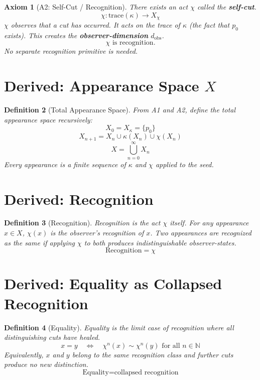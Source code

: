 \documentclass[12pt]{article}
\newtheorem{axiom}{Axiom}
\newtheorem{definition}[axiom]{Definition}
\begin{document}
\begin{axiom}[A2: Self-Cut / Recognition]
There exists an act \(\chi\) called the \textbf{self-cut}.
\[
\chi: \text{trace}(\kappa) \longrightarrow X_\chi
\]
\(\chi\) observes that a cut has occurred. It acts on the trace of \(\kappa\) (the fact that \(p_0\) exists).
This creates the \textbf{observer-dimension} \(d_{\text{obs}}\).
\[
\boxed{\chi \text{ is recognition.}}
\]
No separate recognition primitive is needed.
\end{axiom}

\section{Derived: Appearance Space \(X\)}

\begin{definition}[Total Appearance Space]
From A1 and A2, define the total appearance space recursively:
\[
X_0 = X_\kappa = \{p_0\}
\]
\[
X_{n+1} = X_n \cup \kappa(X_n) \cup \chi(X_n)
\]
\[
X = \bigcup_{n=0}^{\infty} X_n
\]
Every appearance is a finite sequence of \(\kappa\) and \(\chi\) applied to the seed.
\end{definition}

\section{Derived: Recognition}

\begin{definition}[Recognition]
Recognition is the act \(\chi\) itself.
For any appearance \(x \in X\), \(\chi(x)\) is the observer's recognition of \(x\).
Two appearances are recognized as the same if applying \(\chi\) to both produces indistinguishable observer-states.
\[
\boxed{\text{Recognition} = \chi}
\]
\end{definition}

\section{Derived: Equality as Collapsed Recognition}

\begin{definition}[Equality]
Equality is the limit case of recognition where all distinguishing cuts have healed.
\[
x = y \quad\Longleftrightarrow\quad \chi^n(x) \sim \chi^n(y) \text{ for all } n \in \mathbb{N}
\]
Equivalently, \(x\) and \(y\) belong to the same recognition class and further cuts produce no new distinction.
\[
\boxed{\text{Equality} = \text{collapsed recognition}}
\]
\end{definition}
\end{document}
